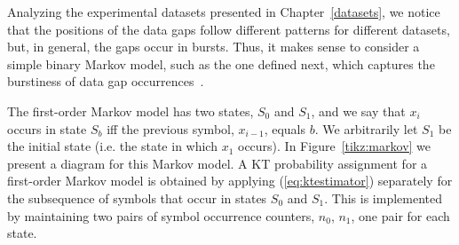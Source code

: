 \vspace{+5pt}
Analyzing the experimental datasets presented in Chapter~\ref{datasets}, we notice that the positions of the data gaps follow different patterns for different datasets, but, in general, the gaps occur in bursts. Thus, it makes sense to consider a simple binary Markov model, such as the one defined next, which captures the burstiness of data gap occurrences~\cite{markovBurst}.


\begin{table}[h]
\begin{minipage}{0.62\textwidth}
The first-order Markov model has two states, $S_0$ and $S_1$, and we say that $x_i$ occurs in state $S_b$ iff the previous symbol, $x_{i-1}$, equals $b$. We arbitrarily let $S_1$ be the initial state (i.e. the state in which $x_1$ occurs). In Figure~\ref{tikz:markov} we present a diagram for this Markov model. A KT probability assignment for a first-order Markov model is obtained by applying (\ref{eq:ktestimator}) separately for the subsequence of symbols that occur in states $S_0$ and $S_1$. This is implemented by maintaining two pairs of symbol occurrence counters, $n_0$, $n_1$, one pair for each state.

\end{minipage}
\hspace{0.02\textwidth}
\begin{minipage}{0.32\textwidth}

\end{minipage}
\end{table}

